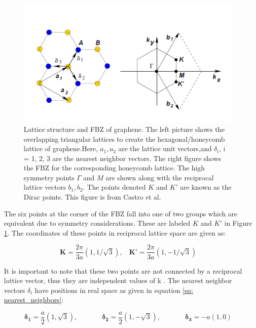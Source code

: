 \documentclass[]{article}
\begin{document}
\begin{figure}[htb]
	\centering
	\includegraphics[scale = 0.75]{graphene_lattice.PNG}
	\caption{Lattice structure and FBZ of graphene. The left picture shows the overlapping triangular lattices to create the hexagonal/honeycomb lattice of graphene.Here, $a_1, a_2$ are the lattice unit vectors,and $\delta_i$, i = 1, 2, 3 are the nearest neighbor vectors. The right figure shows the FBZ for the corresponding honeycomb lattice. The high symmetry points $\Gamma$ and $M$ are shown along with the reciprocal lattice vectors $b_1, b_2$. The points denoted $K$ and $K'$ are known as the Dirac points. This figure is from  Castro et al. \cite{The_Electronic_Properties_of_Graphene}}
	\label{fig: Graphene lattice and FBZ}
\end{figure}

The six points at the corner of the FBZ fall into one of two groups which are equivalent due to symmetry considerations. These are labeled $K$ and $K'$ in Figure \ref{fig: Graphene lattice and FBZ}. The coordinates of these points in reciprocal lattice space are given as:

\begin{equation}\label{eq: Dirac Points}
\mathbf{K} = \frac{2\pi}{3a}(1, 1/\sqrt{3}), \ \ \ \ \mathbf{K'} = \frac{2\pi}{3a}(1, -1/\sqrt{3})
\end{equation}

It is important to note that these two points are not connected by a reciprocal lattice vector, thus they are independent values of k \cite{Lecture5}. The nearest neighbor vectors $\delta_i$ have positions in real space as given in equation \ref{eq: nearest_neighbors}:

\begin{equation}\label{eq: nearest_neighbors}
	\mathbf{\delta_1} = \frac{a}{2}(1, \sqrt{3}), \ \ \ \ \ \ \ \ \ \ \ \ \ \ \ \ \mathbf{\delta_2} = \frac{a}{2}(1, -\sqrt{3}), \ \ \ \  \ \ \ \ \ \ \ \ \ \ \ \ \mathbf{\delta_3} = -a(1, 0)
\end{equation}
\end{document}
